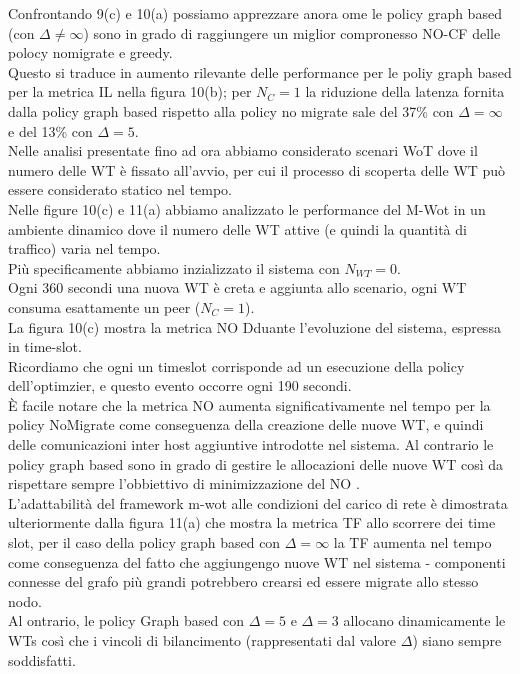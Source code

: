 \documentclass[11pt]{article}
\begin{document}
	Confrontando 9(c) e 10(a) possiamo apprezzare anora ome le policy graph based (con $\Delta \neq \infty$) sono in grado di raggiungere un miglior compronesso NO-CF delle polocy nomigrate e greedy. \\
	Questo si traduce in aumento rilevante delle performance per le poliy graph based per la metrica IL nella figura 10(b); per $N_C = 1$ la riduzione della latenza fornita dalla policy graph based rispetto alla policy no migrate sale del 37\% con $\Delta = \infty$ e del 13\% con $\Delta = 5$. \\
	Nelle analisi presentate fino ad ora abbiamo considerato scenari WoT dove il numero delle WT è fissato all'avvio, per cui il processo di scoperta delle WT può essere considerato statico nel tempo. \\
	Nelle figure 10(c) e 11(a) abbiamo analizzato le performance del M-Wot in un ambiente dinamico dove il numero delle WT attive (e quindi la quantità di traffico) varia nel tempo. \\
	Più specificamente abbiamo inzializzato il sistema con $N_{WT} = 0$. \\
	Ogni 360 secondi una nuova WT è creta e aggiunta allo scenario, ogni WT consuma esattamente un peer ($N_C = 1$). \\
	La figura 10(c) mostra la metrica NO Dduante l'evoluzione del sistema, espressa in time-slot. \\
	Ricordiamo che ogni un timeslot corrisponde ad un esecuzione della policy dell'optimzier, e questo evento occorre ogni 190 secondi. \\
	È facile notare che la metrica NO aumenta significativamente nel tempo per la policy NoMigrate come conseguenza della creazione delle nuove WT, e quindi delle comunicazioni inter host aggiuntive introdotte nel sistema.
	Al contrario le policy graph based sono in grado di gestire le allocazioni delle nuove WT così da rispettare sempre l'obbiettivo di minimizzazione del NO .\\
	L'adattabilità del framework m-wot alle condizioni del carico di rete è dimostrata ulteriormente dalla figura 11(a) che mostra la metrica TF allo scorrere dei time slot, per il caso della policy graph based con $\Delta = \infty$ la TF aumenta nel tempo come conseguenza del fatto che  aggiungengo nuove WT nel sistema - componenti connesse del grafo più grandi potrebbero crearsi ed essere migrate allo stesso nodo. \\Al ontrario, le policy Graph based con $\Delta = 5$ e $\Delta = 3$ allocano dinamicamente le WTs così che i vincoli di bilancimento (rappresentati dal valore $\Delta$) siano sempre soddisfatti.\\
\end{document}
